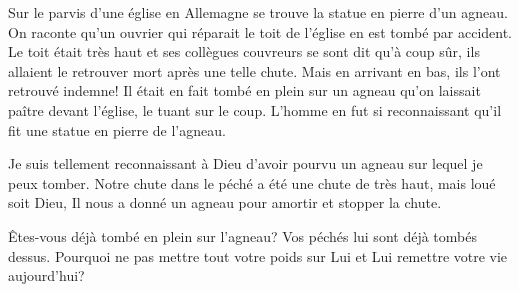 Sur le parvis d'une église en Allemagne se trouve la statue en pierre d'un agneau. On raconte qu'un ouvrier qui r\'eparait le toit de l'église en est tombé par accident. Le toit \'etait très haut et ses collègues couvreurs se sont dit qu'à coup sûr, ils allaient le retrouver mort après une telle chute. Mais en arrivant en bas, ils l'ont retrouvé indemne! Il était en fait tombé en plein sur un agneau qu'on laissait paître devant l'église, le tuant sur le coup. L'homme en fut si reconnaissant qu'il fit une statue en pierre de l'agneau.

Je suis tellement reconnaissant à Dieu d'avoir pourvu un agneau sur lequel je peux tomber. Notre chute dans le péché a été une chute de très haut, mais loué soit Dieu, Il nous a donné un agneau pour amortir et stopper la chute.



Êtes-vous déjà tombé en plein sur l'agneau? Vos péchés lui sont déjà tombés dessus. Pourquoi ne pas mettre tout votre poids sur Lui et Lui remettre votre vie aujourd'hui?

\begin{dvquotes}
\end{dvquotes}
